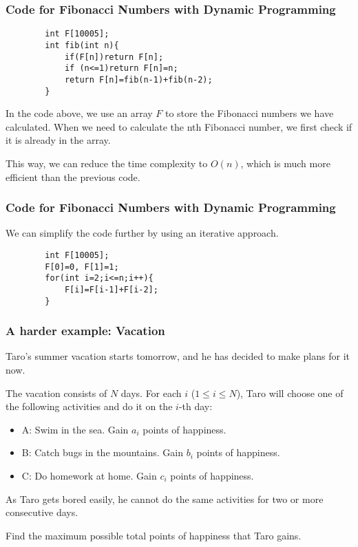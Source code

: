 \documentclass[xcolor=dvipsnames]{beamer}
\begin{document}
    \begin{frame}[fragile]
        \frametitle{Code for Fibonacci Numbers with Dynamic Programming}
        \begin{verbatim}
        int F[10005];
        int fib(int n){
            if(F[n])return F[n];
            if (n<=1)return F[n]=n;
            return F[n]=fib(n-1)+fib(n-2);
        }        
        \end{verbatim}
        In the code above, we use an array $F$ to store the Fibonacci numbers we have calculated.
        When we need to calculate the nth Fibonacci number, we first check if it is already in the array.

        This way, we can reduce the time complexity to $O(n)$, which is much more efficient than the previous code.
    \end{frame}

    \begin{frame}[fragile]
        \frametitle{Code for Fibonacci Numbers with Dynamic Programming}
        We can simplify the code further by using an iterative approach.
        \begin{verbatim}
        int F[10005];
        F[0]=0, F[1]=1;
        for(int i=2;i<=n;i++){
            F[i]=F[i-1]+F[i-2];
        }
        \end{verbatim}
    \end{frame}

    \begin{frame}
        \frametitle{A harder example: Vacation}
        Taro's summer vacation starts tomorrow, and he has decided to make plans for it now.

        The vacation consists of $N$ days. For each $i$ ($1 \leq i \leq N$), Taro will choose one of the following activities and do it on the $i$-th day:

        \begin{itemize}
            \item A: Swim in the sea. Gain $a_i$ points of happiness.
            \item B: Catch bugs in the mountains. Gain $b_i$ points of happiness.
            \item C: Do homework at home. Gain $c_i$ points of happiness.
        \end{itemize}

        As Taro gets bored easily, he cannot do the same activities for two or more consecutive days.

        Find the maximum possible total points of happiness that Taro gains.
    \end{frame}
\end{document}
